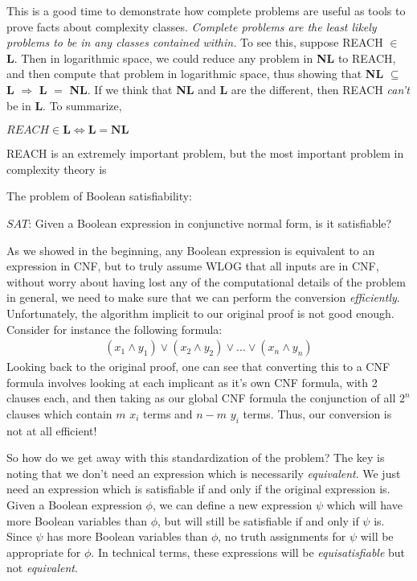This is a good time to demonstrate how complete problems are useful as tools to prove facts about complexity classes. \textit{Complete problems are the least likely problems to be in any classes contained within.} To see this, suppose REACH $\in$ \textbf{L}. Then in logarithmic space, we could reduce any problem in \textbf{NL} to REACH, and then compute that problem in logarithmic space, thus showing that \textbf{NL} $\subseteq$ \textbf{L} $\Rightarrow$ \textbf{L} $=$ \textbf{NL}. If we think that \textbf{NL} and \textbf{L} are the different, then REACH \textit{can't} be in \textbf{L}. To summarize,
\begin{fact}
    $REACH \in \textbf{L} \iff \textbf{L} = \textbf{NL}$
\end{fact}
REACH is an extremely important problem, but the most important problem in complexity theory is
\begin{problem} The problem of Boolean satisfiability:
\begin{center}
    $SAT$: Given a Boolean expression in conjunctive normal form, is it satisfiable?
\end{center}
\end{problem}
As we showed in the beginning, any Boolean expression is equivalent to an expression in CNF, but to truly assume WLOG that all inputs are in CNF, without worry about having lost any of the computational details of the problem in general, we need to make sure that we can perform the conversion \textit{efficiently}. Unfortunately, the algorithm implicit to our original proof is not good enough. Consider for instance the following formula:
\begin{align}
    (x_1\wedge y_1) \vee (x_2 \wedge y_2) \vee ... \vee (x_n \wedge y_n)
\end{align}
Looking back to the original proof, one can see that converting this to a CNF formula involves looking at each implicant as it's own CNF formula, with 2 clauses each, and then taking as our global CNF formula the conjunction of all $2^n$ clauses which contain $m$ $x_i$ terms and $n-m$ $y_i$ terms. Thus, our conversion is not at all efficient!
\par So how do we get away with this standardization of the problem? The key is noting that we don't need an expression which is necessarily \textit{equivalent}. We just need an expression which is satisfiable if and only if the original expression is. Given a Boolean expression $\phi$, we can define a new expression $\psi$ which will have more Boolean variables than $\phi$, but will still be satisfiable if and only if $\psi$ is. Since $\psi$ has more Boolean variables than $\phi$, no truth assignments for $\psi$ will be appropriate for $\phi$. In technical terms, these expressions will be \textit{equisatisfiable} but not \textit{equivalent}. 
